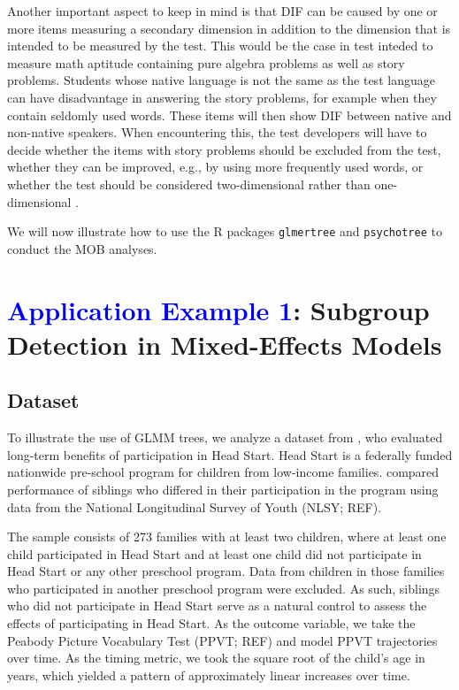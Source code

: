 \documentclass[doc,floatsintext,natbib]{apa7}
\newcommand{\edc}[1]{\textcolor{blue}{#1}}
\begin{document}
Another important aspect to keep in mind is that DIF can be caused by one or more items measuring a secondary dimension in addition to the dimension that is intended to be measured by the test. This would be the case in test inteded to measure math aptitude containing pure algebra problems as well as story problems. Students whose native language is not the same as the test language can have disadvantage in answering the story problems, for example when they contain seldomly used words. These items will then show DIF between native and non-native speakers. When encountering this, the test developers will have to decide whether the items with story problems should be excluded from the test, whether they can be improved, e.g., by using more frequently used words, or whether the test should be considered two-dimensional rather than one-dimensional \citep[see also][for a discussion of the connection between DIF and multidimensionality]{Ack:1992,Stretal:2021:APM}.

We will now illustrate how to use the R packages \texttt{glmertree} and \texttt{psychotree} to conduct the MOB analyses. 




\newpage
\section{\edc{Application Example 1}: Subgroup Detection in Mixed-Effects Models}
\label{sec:TutorialMixed}



\subsection{Dataset}

To illustrate the use of GLMM trees, we analyze a dataset from \cite{Demi09}, who evaluated long-term benefits of participation in Head Start. Head Start is a federally funded nationwide  pre-school program for children from low-income families. \cite{Demi09} compared performance of siblings who differed in their participation in the program using data from the National Longitudinal Survey of Youth (NLSY; REF). 

The sample consists of 273 families with at least two children, where at least one child participated in Head Start and at least one child did not participate in Head Start or any other preschool program. Data from children in those families who participated in another preschool program were excluded. As such, siblings who did not participate in Head Start serve as a natural control to assess the effects of participating in Head Start. As the outcome variable, we take the Peabody Picture Vocabulary Test (PPVT; REF) and model PPVT trajectories over time. As the timing metric, we took the square root of the child's age in years, which yielded a pattern of approximately linear increases over time.
\end{document}
